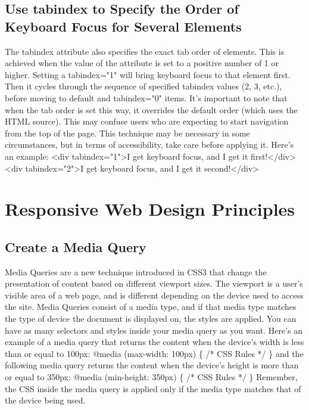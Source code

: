 \documentclass{article}%
\begin{document}
%
\subsection{Use tabindex to Specify the Order of Keyboard Focus for Several Elements}%
\label{subsec:UsetabindextoSpecifytheOrderofKeyboardFocusforSeveralElements}%
The tabindex attribute also specifies the exact tab order of elements. This is achieved when the value of the attribute is set to a positive number of 1 or higher.\newline%
Setting a tabindex="1" will bring keyboard focus to that element first. Then it cycles through the sequence of specified tabindex values (2, 3, etc.), before moving to default and tabindex="0" items.\newline%
It's important to note that when the tab order is set this way, it overrides the default order (which uses the HTML source). This may confuse users who are expecting to start navigation from the top of the page. This technique may be necessary in some circumstances, but in terms of accessibility, take care before applying it.\newline%
Here's an example:\newline%
<div tabindex="1">I get keyboard focus, and I get it first!</div>\newline%
<div tabindex="2">I get keyboard focus, and I get it second!</div>\newline%

%
\newpage%
\section{Responsive Web Design Principles}%
\label{sec:ResponsiveWebDesignPrinciples}%
\subsection{Create a Media Query}%
\label{subsec:CreateaMediaQuery}%
Media Queries are a new technique introduced in CSS3 that change the presentation of content based on different viewport sizes. The viewport is a user's visible area of a web page, and is different depending on the device used to access the site.\newline%
Media Queries consist of a media type, and if that media type matches the type of device the document is displayed on, the styles are applied. You can have as many selectors and styles inside your media query as you want.\newline%
Here's an example of a media query that returns the content when the device's width is less than or equal to 100px:\newline%
@media (max{-}width: 100px) \{ /* CSS Rules */ \}\newline%
and the following media query returns the content when the device's height is more than or equal to 350px:\newline%
@media (min{-}height: 350px) \{ /* CSS Rules */ \}\newline%
Remember, the CSS inside the media query is applied only if the media type matches that of the device being used.\newline%
\end{document}
